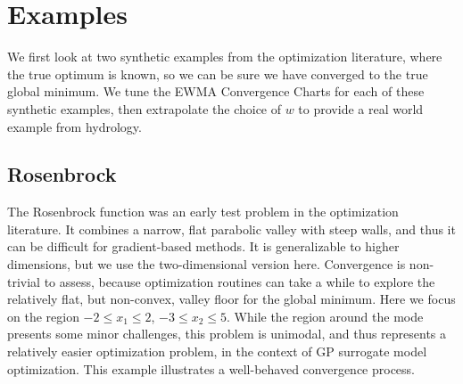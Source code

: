 \documentclass{article}
\begin{document}
\section{Examples}
\label{sec:examples}
%
We first look at two synthetic examples from the optimization literature, 
where the true optimum is known, so we can be sure we have converged to the 
true global minimum. We tune the EWMA Convergence Charts for each of these 
synthetic examples, then extrapolate the choice of $w$ to provide a real world 
example from hydrology.

%
%
\subsection{Rosenbrock}
%
%


%
The Rosenbrock function \citep{rosePaper} was an early test problem in the 
optimization literature. It combines a narrow, flat parabolic valley with 
steep walls, and thus it can be difficult for gradient-based methods. It is 
generalizable to higher dimensions, but we use the two-dimensional version 
here. Convergence is non-trivial to assess, because optimization routines can 
take a while to explore the relatively flat, but non-convex, valley floor for 
the global minimum. Here we focus on the region $-2\le x_1\le2$, 
$-3\le x_2\le5$. While the region around the mode presents some minor 
challenges, this problem is unimodal, and thus represents a relatively easier 
optimization problem, in the context of GP surrogate model optimization. This 
example illustrates a well-behaved convergence process.
\end{document}
